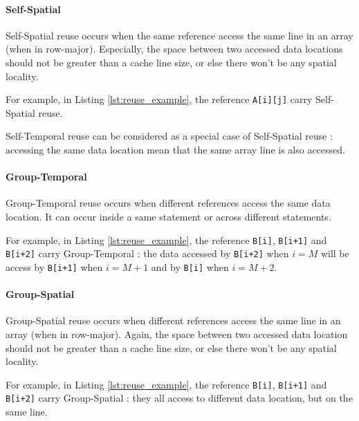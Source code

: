 \documentclass[paper=a4, fontsize=11pt]{scrartcl}
\numberwithin{equation}{section}        %
\numberwithin{figure}{section}          %
\numberwithin{table}{section}               %
\begin{document}
            \paragraph{Self-Spatial}
                Self-Spatial reuse occurs when the same reference access the same
                line in an array (when in row-major). Especially, the space between
                two accessed data locations should not be greater than a cache line size,
                or else there won't be any spatial locality.

                For example, in Listing \ref{lst:reuse_example}, the reference \verb'A[i][j]' carry
                Self-Spatial reuse.

                Self-Temporal reuse can be considered as a special case of
                Self-Spatial reuse : accessing the same data location mean that
                the same array line is also accessed.
            \paragraph{Group-Temporal}
                Group-Temporal reuse occurs when different references access the same
                data location. It can occur inside a same statement or across different
                statements.

                For example, in Listing \ref{lst:reuse_example}, the reference
                \verb'B[i]', \verb'B[i+1]' and \verb'B[i+2]' carry Group-Temporal :
                the data accessed by \verb'B[i+2]' when $i=M$ will be access by
                \verb'B[i+1]' when $i=M+1$ and by \verb'B[i]' when $i=M+2$.

            \paragraph{Group-Spatial}
                Group-Spatial reuse occurs when different references access the same
                line in an array (when in row-major). Again, the space between
                two accessed data location should not be greater than a cache line size,
                or else there won't be any spatial locality.
                
                For example, in Listing \ref{lst:reuse_example}, the reference
                \verb'B[i]', \verb'B[i+1]' and \verb'B[i+2]' carry Group-Spatial :
                they all access to different data location, but on the same line.\\
                \\
\end{document}
